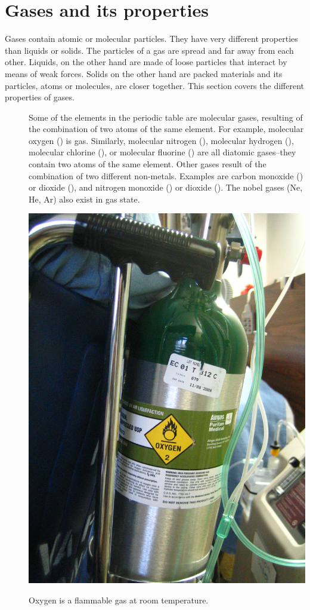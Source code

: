 \documentclass[main.tex]{subfiles}
\begin{document}
\section{Gases and its properties}
Gases contain atomic or molecular particles. They have very different properties than liquids or solids. The particles of a gas are spread and far away from each other. Liquids, on the other hand are made of loose particles that interact by means of weak forces. Solids on the other hand are packed materials and its particles, atoms or molecules, are closer together. This section covers the different properties of gases.
\sloppy 
\begin{description}
\item[] 
Some of the elements in the periodic table are molecular gases, resulting of the combination of two atoms of the same element. For example, molecular oxygen () is gas. Similarly, molecular nitrogen (), molecular hydrogen (), molecular chlorine (), or molecular fluorine () are all diatomic gases--they contain two atoms of the same element. Other gases result of the combination of two different non-metals. Examples are carbon monoxide () or dioxide (), and nitrogen monoxide () or dioxide (). The nobel gases (Ne, He, Ar) also exist in gas state.

\begin{marginfigure}[0cm]%
\includegraphics{chapter8/figure2}
\caption{Oxygen is a flammable gas at room temperature.}
\end{marginfigure}%
 

\end{description}
\end{document}
